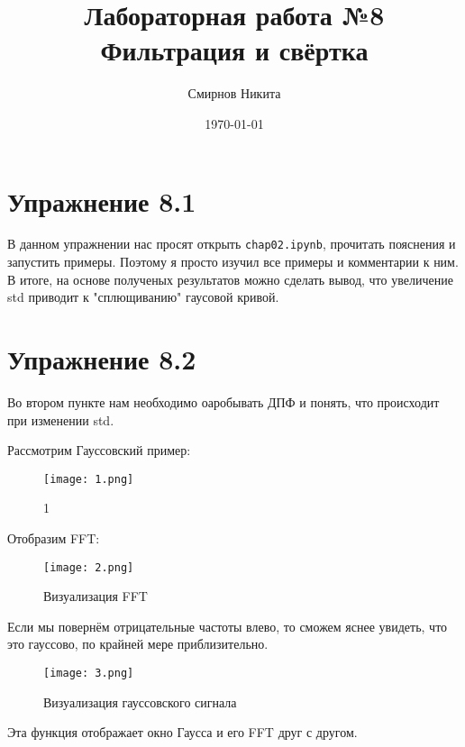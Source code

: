 \documentclass[a4paper,12pt]{report}
\title{Лабораторная работа №8\\Фильтрация и свёртка}
\author{Смирнов Никита}
\date{\today}
\begin{document}
\maketitle
\tableofcontents
\listoffigures
\lstlistoflistings

\maketitle

\chapter{Упражнение 8.1}

В данном упражнении нас просят открыть \texttt{chap02.ipynb}, прочитать пояснения и запустить примеры. Поэтому я просто изучил все примеры и комментарии к ним.
В итоге, на основе полученых результатов можно сделать вывод, что увеличение std приводит к "сплющиванию" гаусовой кривой.

\chapter{Упражнение 8.2}

Во втором пункте нам необходимо оаробывать ДПФ и понять, что происходит при изменении std.

Рассмотрим Гауссовский пример:

\begin{figure}[H]
        \centering
        \texttt{[image: 1.png]}
        \caption{1}
        \label{fig:lab8_fig2_1}
\end{figure}

Отобразим FFT:

\begin{figure}[H]
        \centering
        \texttt{[image: 2.png]}
        \caption{Визуализация FFT}
        \label{fig:lab8_fig2_2}
\end{figure}

Если мы повернём отрицательные частоты влево, то сможем яснее увидеть, что это гауссово, по крайней мере приблизительно.

\begin{figure}[H]
        \centering
        \texttt{[image: 3.png]}
        \caption{Визуализация гауссовского сигнала}
        \label{fig:lab8_fig2_3}
\end{figure}

Эта функция отображает окно Гаусса и его FFT друг с другом.
\end{document}
